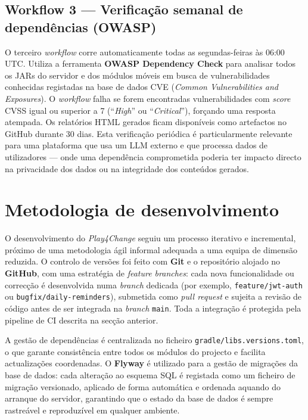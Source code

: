 \subsection*{Workflow 3 --- Verificação semanal de dependências (OWASP)}

O terceiro \emph{workflow} corre automaticamente todas as segundas-feiras às 06:00 UTC. Utiliza a ferramenta \textbf{OWASP Dependency Check} para analisar todos os JARs do servidor e dos módulos móveis em busca de vulnerabilidades conhecidas registadas na base de dados CVE (\emph{Common Vulnerabilities and Exposures}). O \emph{workflow} falha se forem encontradas vulnerabilidades com \emph{score} CVSS igual ou superior a 7 (``\emph{High}'' ou ``\emph{Critical}''), forçando uma resposta atempada. Os relatórios HTML gerados ficam disponíveis como artefactos no GitHub durante 30 dias. Esta verificação periódica é particularmente relevante para uma plataforma que usa um LLM externo e que processa dados de utilizadores --- onde uma dependência comprometida poderia ter impacto directo na privacidade dos dados ou na integridade dos conteúdos gerados.

\section{Metodologia de desenvolvimento}
\label{sec:metodologia-desenvolvimento}

O desenvolvimento do \emph{Play4Change} seguiu um processo iterativo e incremental, próximo de uma metodologia ágil informal adequada a uma equipa de dimensão reduzida. O controlo de versões foi feito com \textbf{Git} e o repositório alojado no \textbf{GitHub}, com uma estratégia de \emph{feature branches}: cada nova funcionalidade ou correcção é desenvolvida numa \emph{branch} dedicada (por exemplo, \texttt{feature/jwt-auth} ou \texttt{bugfix/daily-reminders}), submetida como \emph{pull request} e sujeita a revisão de código antes de ser integrada na \emph{branch} \texttt{main}. Toda a integração é protegida pela pipeline de CI descrita na secção anterior.

A gestão de dependências é centralizada no ficheiro \texttt{gradle/libs.versions.toml}, o que garante consistência entre todos os módulos do projecto e facilita actualizações coordenadas. O \textbf{Flyway} é utilizado para a gestão de migrações da base de dados: cada alteração ao esquema SQL é registada como um ficheiro de migração versionado, aplicado de forma automática e ordenada aquando do arranque do servidor, garantindo que o estado da base de dados é sempre rastreável e reproduzível em qualquer ambiente.
